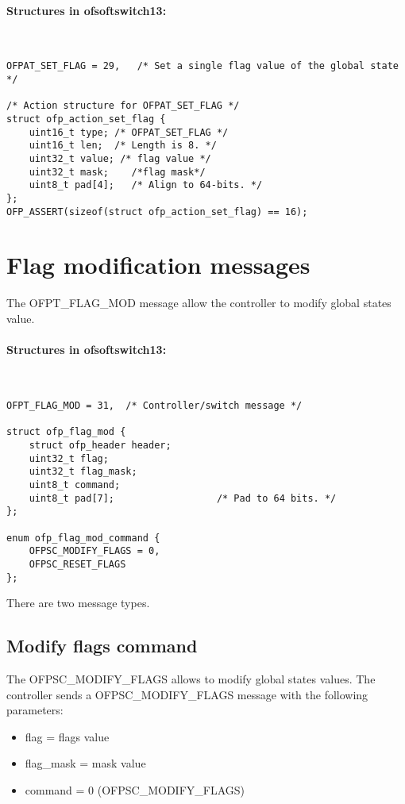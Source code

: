 \paragraph{Structures in ofsoftswitch13:}\mbox{}\\
\begin{lstlisting}[style=customc]
OFPAT_SET_FLAG = 29,   /* Set a single flag value of the global state */

/* Action structure for OFPAT_SET_FLAG */
struct ofp_action_set_flag {
    uint16_t type; /* OFPAT_SET_FLAG */
    uint16_t len;  /* Length is 8. */
    uint32_t value; /* flag value */
    uint32_t mask;    /*flag mask*/
    uint8_t pad[4];   /* Align to 64-bits. */
};
OFP_ASSERT(sizeof(struct ofp_action_set_flag) == 16);
\end{lstlisting}

\section{Flag modification messages}
\label{section:flag_mod_msg}
The OFPT\_FLAG\_MOD message allow the controller to modify global states value.
\paragraph{Structures in ofsoftswitch13:}\mbox{}\\
\begin{lstlisting}[style=customc]
OFPT_FLAG_MOD = 31,  /* Controller/switch message */

struct ofp_flag_mod {
    struct ofp_header header;
    uint32_t flag;
    uint32_t flag_mask;
    uint8_t command;
    uint8_t pad[7];                  /* Pad to 64 bits. */
};

enum ofp_flag_mod_command { 
    OFPSC_MODIFY_FLAGS = 0,
    OFPSC_RESET_FLAGS
};

\end{lstlisting}

There are two message types.
\subsection{Modify flags command}
The OFPSC\_MODIFY\_FLAGS allows to modify global states values. The controller sends a OFPSC\_MODIFY\_FLAGS message with the following parameters:
\begin{itemize}
\setlength\itemsep{0em}
\item flag = flags value
\item flag\_mask = mask value
\item command = 0 (OFPSC\_MODIFY\_FLAGS)
\end{itemize}

